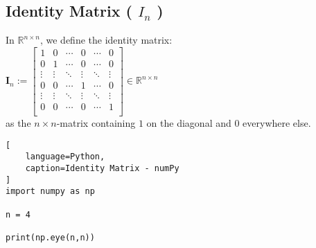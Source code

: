 \subsection{Identity Matrix ( $I_n$ )}

In $\mathbb{R}^{n\times n}$, we define the identity matrix:\\
\vspace{0.5cm}
\hfill
$
    \bm{I}_n
    := \begin{bmatrix}
        1 & 0 & \cdots & 0 & \cdots & 0 \\
        0 & 1 & \cdots & 0 & \cdots & 0 \\
        \vdots & \vdots & \ddots & \vdots & \ddots & \vdots \\
        0 & 0 & \cdots & 1 & \cdots & 0 \\
        \vdots & \vdots & \ddots & \vdots & \ddots & \vdots \\
        0 & 0 & \cdots & 0 & \cdots & 1 \\
    \end{bmatrix}
    \in \mathbb{R}^{n\times n}
$
\hfill \cite{mfml/book/mml/Deisenroth-Faisal-Ong}
\\
as the $n \times n$-matrix containing $1$ on the diagonal and $0$ everywhere else.







\begin{lstlisting}[
    language=Python,
    caption=Identity Matrix - numPy
]
import numpy as np

n = 4

print(np.eye(n,n))
\end{lstlisting}








